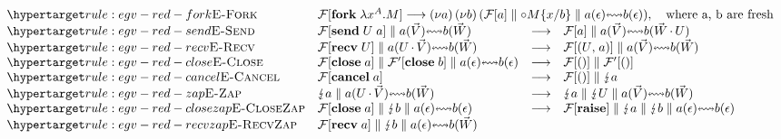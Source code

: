 \begin{figure*}
\begin{mdframed}
\begin{highlight}
\[      \begin{array}{llcl}
        \rlabel{\textsc{E-Fork}}{rule:egv-red-fork}
        & \multicolumn{3}{l}{%
          {\gvPlug{\gvConf{F}}{\gvFork{\gvAbs[A]{x}{M}}}}
          \gvRedArr
          {\gvRes{a}{\gvRes{b}{\gvPPar{\gvPlug{\gvConf{F}}{a}}{%
          \gvPar{\gvChild{\gvSub{M}{b}{x}}}{\gvBuf{a}{\gvVecEmp}{b}{\gvVecEmp}}}}}},
          {\quad\text{where \tm{a}, \tm{b} are fresh}}}
        \\
        \rlabel{\textsc{E-Send}}{rule:egv-red-send}
        & {\gvPar{\gvPlug{\gvConf{F}}{\gvSend{U}{a}}}{%
          \gvBuf{a}{\gvVec{V}}{b}{\gvVec{W}}}}
        & \gvRedArr
        & {\gvPar{\gvPlug{\gvConf{F}}{a}}{%
          \gvBuf{a}{\gvVec{V}}{b}{\gvVec{W}\gvVecAdd\gvVar{U}}}}
        \\
        \rlabel{\textsc{E-Recv}}{rule:egv-red-recv}
        & {\gvPar{\gvPlug{\gvConf{F}}{\gvRecv{U}}}{%
          \gvBuf{a}{\gvVar{U}\gvVecAdd\gvVec{V}}{b}{\gvVec{W}}}}
        & \gvRedArr
        & {\gvPar{\gvPlug{\gvConf{F}}{\gvPair{U}{a}}}{%
          \gvBuf{a}{\gvVec{V}}{b}{\gvVec{W}}}}
        \\
        \rlabel{\textsc{E-Close}}{rule:egv-red-close}
        & {\gvPar{\gvPlug{\gvConf{F}}{\gvClose{a}}}{%
          \gvPar{\gvPlug{\gvConf{F'}}{\gvClose{b}}}{%
          \gvBuf{a}{\gvVecEmp}{b}{\gvVecEmp}}}}
        & \gvRedArr
        & {\gvPar{\gvPlug{\gvConf{F}}{\gvUnit}}{%
          \gvPlug{\gvConf{F'}}{\gvUnit}}}
        \\
        \rlabel{\textsc{E-Cancel}}{rule:egv-red-cancel}
        & {\gvPlug{\gvConf{F}}{\gvCancel{a}}}
        & \gvRedArr
        & {\gvPar{\gvPlug{\gvConf{F}}{\gvUnit}}{\gvZap{a}}}
        \\
        \rlabel{\textsc{E-Zap}}{rule:egv-red-zap}
        & {\gvPar{\gvZap{a}}{\gvBuf{a}{\gvVar{U}\gvVecAdd\gvVec{V}}{b}{\gvVec{W}}}}
        & \gvRedArr
        & {\gvPar{\gvZap{a}}{\gvPar{\gvZap{U}}{\gvBuf{a}{\gvVec{V}}{b}{\gvVec{W}}}}}
        \\
        \rlabel{\textsc{E-CloseZap}}{rule:egv-red-closezap}
        & {\gvPar{\gvPlug{\gvConf{F}}{\gvClose{a}}}{\gvPar{\gvZap{b}}{%
          \gvBuf{a}{\gvVecEmp}{b}{\gvVecEmp}}}}
        & \gvRedArr
        & {\gvPar{\gvPlug{\gvConf{F}}{\gvRaise}}{\gvPar{\gvZap{a}}{%
          \gvPar{\gvZap{b}}{\gvBuf{a}{\gvVecEmp}{b}{\gvVecEmp}}}}}
        \\
        \rlabel{\textsc{E-RecvZap}}{rule:egv-red-recvzap}
        & {\gvPar{\gvPlug{\gvConf{F}}{\gvRecv{a}}}{\gvPar{\gvZap{b}}{%
          \gvBuf{a}{\gvVecEmp}{b}{\gvVec{W}}}}}

\end{array}\]
\end{highlight}
\end{mdframed}
\end{figure*}
